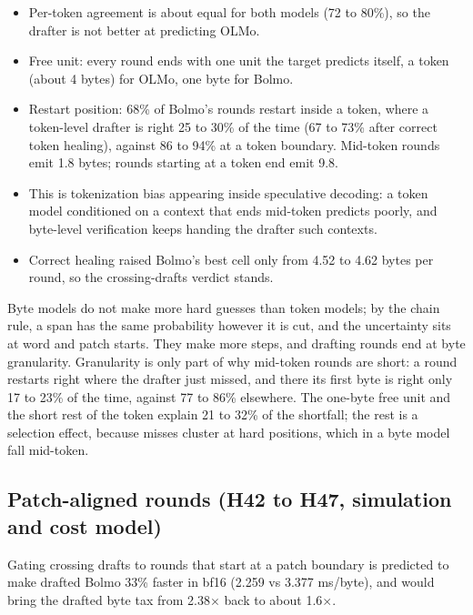 \documentclass[11pt,a4paper]{article}
\newcommand{\x}{\ensuremath{\times}}
\begin{document}
\begin{itemize}
\item
  Per-token agreement is about equal for both models (72 to 80\%), so the drafter is not better at predicting OLMo.
\item
  Free unit: every round ends with one unit the target predicts itself, a token (about 4 bytes) for OLMo, one byte for Bolmo.
\item
  Restart position: 68\% of Bolmo's rounds restart inside a token, where a token-level drafter is right 25 to 30\% of the time (67 to 73\% after correct token healing), against 86 to 94\% at a token boundary. Mid-token rounds emit 1.8 bytes; rounds starting at a token end emit 9.8.
\item
  This is tokenization bias \citep{phan2025exact} appearing inside speculative decoding: a token model conditioned on a context that ends mid-token predicts poorly, and byte-level verification keeps handing the drafter such contexts.
\item
  Correct healing raised Bolmo's best cell only from 4.52 to 4.62 bytes per round, so the crossing-drafts verdict stands.
\end{itemize}

Byte models do not make more hard guesses than token models; by the chain rule, a span has the same probability however it is cut, and the uncertainty sits at word and patch starts. They make more steps, and drafting rounds end at byte granularity. Granularity is only part of why mid-token rounds are short: a round restarts right where the drafter just missed, and there its first byte is right only 17 to 23\% of the time, against 77 to 86\% elsewhere. The one-byte free unit and the short rest of the token explain 21 to 32\% of the shortfall; the rest is a selection effect, because misses cluster at hard positions, which in a byte model fall mid-token.

\subsection{Patch-aligned rounds (H42 to H47, simulation and cost model)}\label{patch-aligned-rounds-h42-to-h47-simulation-and-cost-model}

Gating crossing drafts to rounds that start at a patch boundary is predicted to make drafted Bolmo 33\% faster in bf16 (2.259 vs 3.377 ms/byte), and would bring the drafted byte tax from 2.38\x{} back to about 1.6\x{}.
\end{document}
